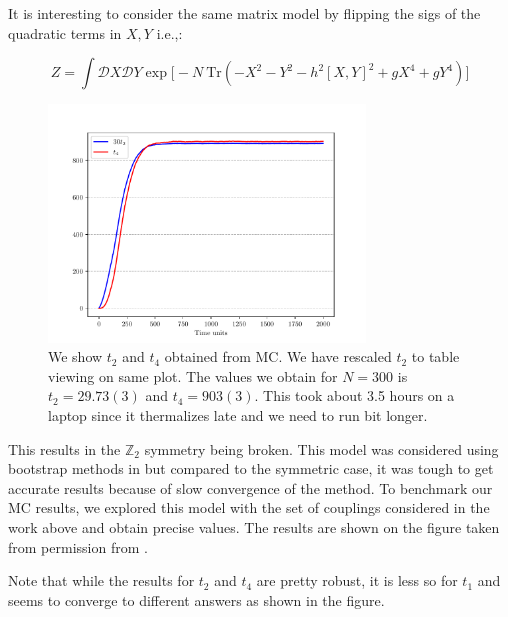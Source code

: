 \documentclass[11pt]{article}
\begin{document}
It is interesting to consider the same matrix model by flipping the sigs of the quadratic terms in $X,Y$ i.e.,:

\begin{equation}
\label{eq:GHM2} 
Z = \int \mathcal{D}X \mathcal{D}Y \exp \Big[-N ~ \mbox{Tr} (-X^2  -Y^2 - h^2 [X,Y]^2 + gX^4 + gY^4) \Big]	
\end{equation} 


\begin{figure}[htbp] 
	\centering 
	\includegraphics[width=0.75\textwidth]{figs/2MM_symb_t2_t4.pdf}
	\caption{\label{fig:2MM_t2t4}We show $t_{2}$ and $t_{4}$ obtained from MC. We have rescaled $t_{2}$ to
	table viewing on same plot. The values we obtain for $N=300$ is $t_{2} = 29.73(3)$ and $t_{4} = 903(3)$.
	This took about 3.5 hours on a laptop since it thermalizes late and we need to run bit longer.}
\end{figure}

This results in the $\mathbb{Z}_{2}$ 
symmetry being broken. This model was considered using bootstrap methods in 
\cite{} but compared to the symmetric case, it was tough to get accurate results 
because of slow convergence of the method. To benchmark our MC results, we explored this model
with the set of couplings considered in the work above and obtain precise values. 
The results are shown on the figure taken from permission from \cite{}. 

Note that while the results for $t_{2}$ and $t_{4}$ are pretty robust, 
it is less so for $t_{1}$ and seems to converge to different answers as shown
in the figure.
\end{document}
